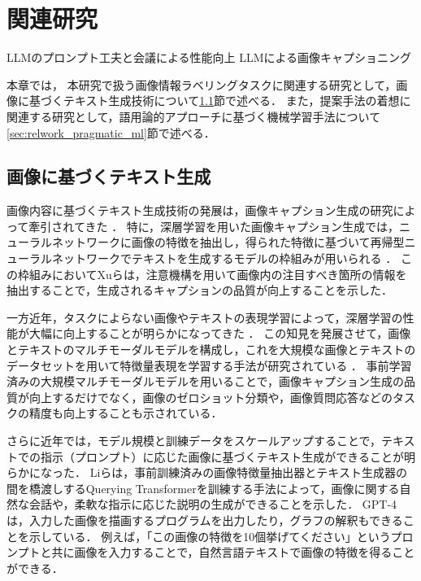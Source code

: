 \documentclass[a4paper,11pt]{jreport}
\begin{document}
\chapter{関連研究}

LLMのプロンプト工夫と会議による性能向上
LLMによる画像キャプショニング

本章では，
本研究で扱う画像情報ラベリングタスクに関連する研究として，画像に基づくテキスト生成技術について\ref{sec:relwork_image_captioning}節で述べる．
また，提案手法の着想に関連する研究として，語用論的アプローチに基づく機械学習手法について\ref{sec:relwork_pragmatic_ml}節で述べる．

\section{画像に基づくテキスト生成}
\label{sec:relwork_image_captioning}
画像内容に基づくテキスト生成技術の発展は，画像キャプション生成の研究によって牽引されてきた \cite{Farhadi2010}．
特に，深層学習を用いた画像キャプション生成では，ニューラルネットワークに画像の特徴を抽出し，得られた特徴に基づいて再帰型ニューラルネットワークでテキストを生成するモデルの枠組みが用いられる \cite{Vinyals2017}．
この枠組みにおいてXuら\cite{Xu2015}は，注意機構を用いて画像内の注目すべき箇所の情報を抽出することで，生成されるキャプションの品質が向上することを示した．

一方近年，タスクによらない画像やテキストの表現学習によって，深層学習の性能が大幅に向上することが明らかになってきた \cite{Devlin2019}．
この知見を発展させて，画像とテキストのマルチモーダルモデルを構成し，これを大規模な画像とテキストのデータセットを用いて特徴量表現を学習する手法が研究されている \cite{Yin2023,Gan2022}．
事前学習済みの大規模マルチモーダルモデルを用いることで，画像キャプション生成の品質が向上する\cite{Dai2023}だけでなく，画像のゼロショット分類\cite{Radford2021}や，画像質問応答\cite{Song2022}などのタスクの精度も向上することも示されている．

さらに近年では，モデル規模と訓練データをスケールアップすることで，テキストでの指示（プロンプト）に応じた画像に基づくテキスト生成ができることが明らかになった．
Liら\cite{Li2023}は，事前訓練済みの画像特徴量抽出器とテキスト生成器の間を橋渡しするQuerying Transformerを訓練する手法によって，画像に関する自然な会話や，柔軟な指示に応じた説明の生成ができることを示した．
GPT-4\cite{Bubeck2023}は，入力した画像を描画するプログラムを出力したり，グラフの解釈もできることを示している．
例えば，「この画像の特徴を10個挙げてください」というプロンプトと共に画像を入力することで，自然言語テキストで画像の特徴を得ることができる．
\end{document}
